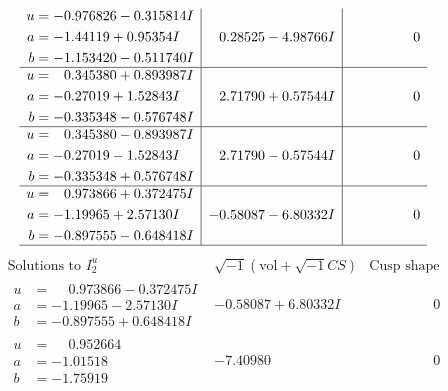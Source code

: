\documentclass[1p]{elsarticle_modified}
\theoremstyle{definition}
\newcommand{\I}{\sqrt{-1}}
\begin{document}
$$\begin{array}{c|c|c}
\begin{aligned}
u &= -0.976826 - 0.315814 I \\
a &= -1.44119 + 0.95354 I \\
b &= -1.153420 - 0.511740 I\end{aligned}
 & \phantom{-}0.28525 - 4.98766 I & \phantom{-0.000000 } 0 \\ \hline\begin{aligned}
u &= \phantom{-}0.345380 + 0.893987 I \\
a &= -0.27019 + 1.52843 I \\
b &= -0.335348 - 0.576748 I\end{aligned}
 & \phantom{-}2.71790 + 0.57544 I & \phantom{-0.000000 } 0 \\ \hline\begin{aligned}
u &= \phantom{-}0.345380 - 0.893987 I \\
a &= -0.27019 - 1.52843 I \\
b &= -0.335348 + 0.576748 I\end{aligned}
 & \phantom{-}2.71790 - 0.57544 I & \phantom{-0.000000 } 0 \\ \hline\begin{aligned}
u &= \phantom{-}0.973866 + 0.372475 I \\
a &= -1.19965 + 2.57130 I \\
b &= -0.897555 - 0.648418 I\end{aligned}
 & -0.58087 - 6.80332 I & \phantom{-0.000000 } 0\\
 \hline 
 \end{array}$$\newpage$$\begin{array}{c|c|c}  
\text{Solutions to }I^u_{2}& \I (\text{vol} + \sqrt{-1}CS) & \text{Cusp shape}\\
 \hline 
\begin{aligned}
u &= \phantom{-}0.973866 - 0.372475 I \\
a &= -1.19965 - 2.57130 I \\
b &= -0.897555 + 0.648418 I\end{aligned}
 & -0.58087 + 6.80332 I & \phantom{-0.000000 } 0 \\ \hline\begin{aligned}
u &= \phantom{-}0.952664\phantom{ +0.000000I} \\
a &= -1.01518\phantom{ +0.000000I} \\
b &= -1.75919\phantom{ +0.000000I}\end{aligned}
 & -7.40980\phantom{ +0.000000I} & \phantom{-0.000000 } 0 \\ \hline\begin{aligned}

\end{aligned}
\end{array}$$
\end{document}
